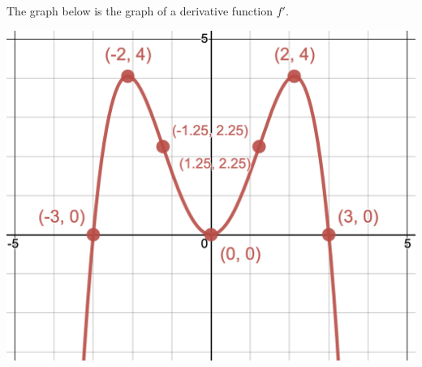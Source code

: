 \documentclass{siproblemset}
\begin{document}
    \vspace{-1cm}
    \begin{multipartquestion}{The graph below is the graph of a derivative function $f'$.}
        \begin{multicols}{2}
            \begin{center}
                \includegraphics[width=\linewidth]{img/pt3-graph1}
            \end{center}
            \vfill\null
            \columnbreak
            \ \newline
            \ \newline
            \ \newline
        \end{multicols}
    \end{multipartquestion}
\end{document}
